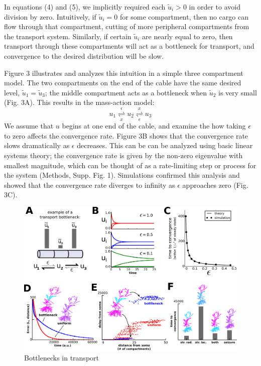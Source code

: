 \documentclass[10pt]{wlpeerj}
\begin{document}
In equations (4) and (5), we implicitly required each $\tilde{u}_i > 0$ in order to avoid division by zero.
Intuitively, if $\tilde{u}_i = 0$ for some compartment, then no cargo can flow through that compartment, cutting of more peripheral compartments from the transport system.
Similarly, if certain $\tilde{u}_i$ are nearly equal to zero, then transport through these compartments will act as a bottleneck for transport, and convergence to the desired distribution will be slow.

Figure 3 illustrates and analyzes this intuition in a simple three compartment model.
The two compartments on the end of the cable have the same desired level, $\tilde{u}_1 = \tilde{u}_3$; the middle compartment acts as a bottleneck when $\tilde{u}_2$ is very small (Fig. 3A).
This results in the mass-action model:
\begin{equation}
u_1 \underset{x}{\overset{\epsilon}{\rightleftharpoons}} u_2 \underset{\epsilon}{\overset{x}{\rightleftharpoons}} u_3
\end{equation}
We assume that $u$ begins at one end of the cable, and examine the how taking $\epsilon$ to zero affects the convergence rate.
Figure 3B shows that the convergence rate slows dramatically as $\epsilon$ decreases.
This can be can be analyzed using basic linear systems theory; the convergence rate is given by the non-zero eigenvalue with smallest magnitude, which can be thought of as a rate-limiting step or process for the system (Methods, Supp. Fig. 1).
Simulations confirmed this analysis and showed that the convergence rate diverges to infinity as $\epsilon$ approaches zero (Fig. 3C).

\begin{figure}[!htbp]
\begin{center}
\includegraphics[width=0.9\columnwidth]{03_convergence.png}
\caption{Bottlenecks in transport}
\end{center}
\end{figure}
\end{document}
